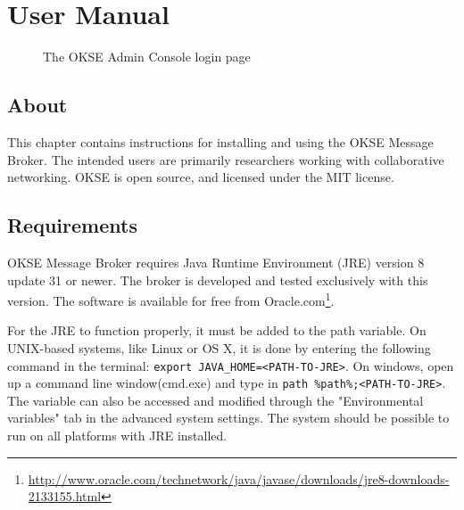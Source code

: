 \chapter{User Manual}
\label{appendix-user-manual}

\begin{center}
  \begin{figure}[ht!]
    \caption{The OKSE Admin Console login page} 
    \label{fig:OKSE Admin Console login page}
  \end{figure}
\end{center}

\section{About}

This chapter contains instructions for installing and using the OKSE Message Broker. The intended users are primarily researchers working with collaborative networking. OKSE is open source, and licensed under the MIT license.

\section{Requirements}

OKSE Message Broker requires Java Runtime Environment (JRE) version 8 update 31 or newer. The broker is developed and tested exclusively with this version. The software is available for free from Oracle.com\footnote{\url{http://www.oracle.com/technetwork/java/javase/downloads/jre8-downloads-2133155.html}}.

For the JRE to function properly, it must be added to the path variable. On UNIX-based systems, like Linux or OS X, it is done by entering the following command in the terminal: \verb!export JAVA_HOME=<PATH-TO-JRE>!. On windows, open up a command line window(cmd.exe) and type in  \verb!path %path%;<PATH-TO-JRE>!.
The variable can also be accessed and modified through the "Environmental variables" tab in the advanced system settings. The system should be possible to run on all platforms with JRE installed. 

